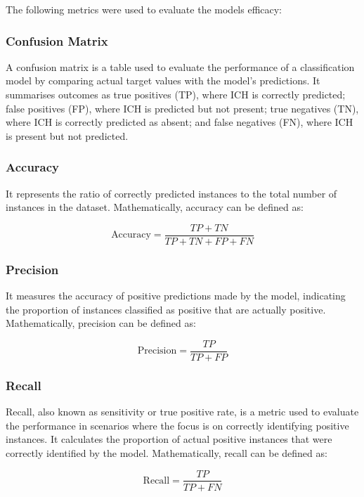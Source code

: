 The following metrics were used to evaluate the models efficacy:

\subsubsection{Confusion Matrix}

A confusion matrix is a table used to evaluate the performance of a classification model by comparing actual target values with the model’s predictions. It summarises outcomes as true positives (TP), where ICH is correctly predicted; false positives (FP), where ICH is predicted but not present; true negatives (TN), where ICH is correctly predicted as absent; and false negatives (FN), where ICH is present but not predicted.

\subsubsection{Accuracy}
It represents the ratio of correctly predicted instances to the total number of instances in the dataset. Mathematically, accuracy can be defined as:

\begin{equation*}
    \text{Accuracy} = \frac{TP + TN}{TP + TN + FP + FN}
\end{equation*}

\subsubsection{Precision}
It measures the accuracy of positive predictions made by the model, indicating the proportion of instances classified as positive that are actually positive. Mathematically, precision can be defined as:

\begin{equation*}
    \text{Precision} = \frac{TP}{TP + FP}
\end{equation*}

\subsubsection{Recall}
Recall, also known as sensitivity or true positive rate, is a metric used to evaluate the performance in scenarios where the focus is on correctly identifying positive instances. It calculates the proportion of actual positive instances that were correctly identified by the model. Mathematically, recall can be defined as:

\begin{equation*}
    \text{Recall} = \frac{TP}{TP + FN}
\end{equation*}
